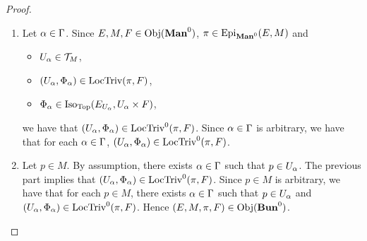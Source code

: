\documentclass{book}
\begin{document}
\begin{proof}
\begin{enumerate}
\begin{align*}
				& = \bigcup_{\mu \in \Pi^M_{\al}} \bigg[ \bigcup_{\nu \in \Pi^F}\Phi_{\al}^{-1} ( V^M_{\al, \mu} \times V^F_{\nu} ) \bigg] \\
				& = \bigcup_{(\mu, \nu) \in \Pi^M_{\al} \times \Pi^F} V^E_{\al, \mu, \nu} 
			\end{align*}
			Hence $E_{U_{\al}} \in \MT_E$, $(V^E_{\al, \mu, \nu})_{(\mu, \nu) \in \Pi^M_{\al} \times \Pi^F}$ is an open cover of $E_{U_{\al}}$ and $\Phi_{\al}$ is a local homeomorphism. Since $\Phi_{\al}$ is a bijection,  implies that $\Phi_{\al} \in \Iso_{\bTop}(E_{U_{\al}}, U_{\al} \times F)$. Since $\al \in \Gam$ is arbitrary, we have that for each $\al \in \Gam$, $\Phi_{\al}) \in \Iso_{\Top}(E_{U_{\al}}, U_{\al} \times F)$. Let $(\al, \mu, \nu) \in \Pi^E$. Since 
			\begin{itemize}
				\item $V^E_{\al, \mu, \nu} \subset E_{U_{\al}}$
				\item $\prj_1: M \times F \rightarrow M$ is continuous
				\item $\Phi_{\al}: E_{U_{\al}} \rightarrow U_{\al} \times F$ is continuous
				\item $\pi|_{V^E_{\al, \mu, \nu}} = \prj_1 \circ \Phi|_{V^E_{\al, \mu, \nu}}$
			\end{itemize}
			we have that $\pi|_{V^E_{\al, \mu, \nu}}: V^E_{\al, \mu, \nu} \rightarrow V^M_{\al, \mu}$ is continuous. Since $(\al, \mu, \nu) \in \Pi^E$ is arbitrary and $(V^E_{\al, \mu, \nu})_{(\al, \mu, \nu) \in \Pi^E }$ is an open cover of $E$,  implies that $\pi \in \Hom_{\bManz}(E, M)$. Since $\pi$ is surjective, $\pi \in \Epi_{\bManz}(E, M)$.
			\item Let $\al \in \Gam$. Since $E,M,F \in \operatorname{Obj}(\operatorname*{\text{\textbf{Man}}^0})$, $\pi \in \Epi_{\bManz}(E,M)$ and 
			\begin{itemize}
				\item $U_{\alpha} \in \mathcal{T}_M$,
				\item $(U_{\alpha}, \Phi_{\alpha}) \in \text{LocTriv}(\pi, F)$,
				\item $\Phi_{\alpha} \in \operatorname{Iso}_{\operatorname*{\text{Top}}}(E_{U_{\alpha}}, U_{\alpha} \times F)$,
			\end{itemize}
			we have that $(U_{\alpha}, \Phi_{\alpha}) \in \text{LocTriv}^0(\pi, F)$. Since $\al \in \Gam$ is arbitrary, we have that for each $\al \in \Gam$, $(U_{\alpha}, \Phi_{\alpha}) \in \text{LocTriv}^0(\pi, F)$.
			\item Let $p \in M$. By assumption, there exists $\al \in \Gam$ such that $p \in U_{\alpha}$. The previous part implies that $(U_{\alpha}, \Phi_{\alpha}) \in \text{LocTriv}^0(\pi, F)$. Since $p \in M$ is arbitrary, we have that for each $p \in M$, there exists $\al \in \Gam$ such that $p \in U_{\alpha}$ and $(U_{\alpha}, \Phi_{\alpha}) \in \text{LocTriv}^0(\pi, F)$. Hence $(E, M, \pi, F) \in \operatorname{Obj}(\operatorname*{\text{\textbf{Bun}}^0})$.
		\end{enumerate}
	\end{proof}
	
\end{document}
